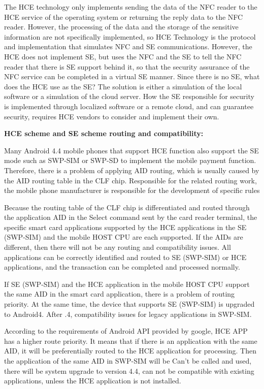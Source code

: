 \documentclass[journal]{IEEEtran}
\begin{document}
The HCE technology only implements sending the data of the NFC reader to the HCE service of the operating system or returning the reply data to the NFC reader. However, the processing of the data and the storage of the sensitive information are not specifically implemented, so HCE Technology is the protocol and implementation that simulates NFC and SE communications. However, the HCE does not implement SE, but uses the NFC and the SE to tell the NFC reader that there is SE support behind it, so that the security assurance of the NFC service can be completed in a virtual SE manner. Since there is no SE, what does the HCE use as the SE? The solution is either a simulation of the local software or a simulation of the cloud server. How the SE responsible for security is implemented through localized software or a remote cloud, and can guarantee security, requires HCE vendors to consider and implement their own.

\textbf{HCE scheme and SE scheme routing and compatibility:}

Many Android 4.4 mobile phones that support HCE function also support the SE mode such as SWP-SIM or SWP-SD to implement the mobile payment function. Therefore, there is a problem of applying AID routing, which is usually caused by the AID routing table in the CLF chip. Responsible for the related routing work, the mobile phone manufacturer is responsible for the development of specific rules

Because the routing table of the CLF chip is differentiated and routed through the application AID in the Select command sent by the card reader terminal, the specific smart card applications supported by the HCE applications in the SE (SWP-SIM) and the mobile HOST CPU are each supported. If the AIDs are different, then there will not be any routing and compatibility issues. All applications can be correctly identified and routed to SE (SWP-SIM) or HCE applications, and the transaction can be completed and processed normally.

If SE (SWP-SIM) and the HCE application in the mobile HOST CPU support the same AID in the smart card application, there is a problem of routing priority. At the same time, the device that supports SE (SWP-SIM) is upgraded to Android4. After .4, compatibility issues for legacy applications in SWP-SIM.

According to the requirements of Android API provided by google, HCE APP has a higher route priority. It means that if there is an application with the same AID, it will be preferentially routed to the HCE application for processing. Then the application of the same AID in SWP-SIM will be Can't be called and used, there will be system upgrade to version 4.4, can not be compatible with existing applications, unless the HCE application is not installed.
\end{document}
